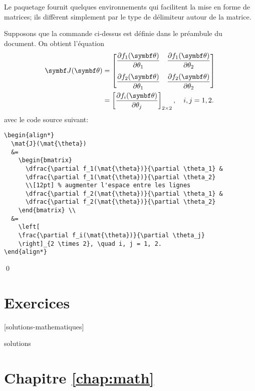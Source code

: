 \begin{exemple}
  Le paquetage  fournit quelques environnements qui
  facilitent la mise en forme de matrices; ils diffèrent simplement
  par le type de délimiteur autour de la matrice.

  Supposons que la commande \cmdprint{\mat} ci-dessus est définie dans
  le préambule du document. On obtient l'équation
  \begin{align*}
    \mat{J}(\mat{\theta})
    &=
      \begin{bmatrix}
        \dfrac{\partial f_1(\mat{\theta})}{\partial \theta_1} &
        \dfrac{\partial f_1(\mat{\theta})}{\partial \theta_2} \\[12pt]
        \dfrac{\partial f_2(\mat{\theta})}{\partial \theta_1} &
        \dfrac{\partial f_2(\mat{\theta})}{\partial \theta_2}
      \end{bmatrix} \\
    &=
      \left[
      \frac{\partial f_i(\mat{\theta})}{\partial \theta_j}
      \right]_{2 \times 2}, \quad i, j = 1, 2.
  \end{align*}
  avec le code source suivant:
\begin{lstlisting}
\begin{align*}
  \mat{J}(\mat{\theta})
  &=
    \begin{bmatrix}
      \dfrac{\partial f_1(\mat{\theta})}{\partial \theta_1} &
      \dfrac{\partial f_1(\mat{\theta})}{\partial \theta_2}
      \\[12pt] % augmenter l'espace entre les lignes
      \dfrac{\partial f_2(\mat{\theta})}{\partial \theta_1} &
      \dfrac{\partial f_2(\mat{\theta})}{\partial \theta_2}
    \end{bmatrix} \\
  &=
    \left[
    \frac{\partial f_i(\mat{\theta})}{\partial \theta_j}
    \right]_{2 \times 2}, \quad i, j = 1, 2.
\end{align*}
\end{lstlisting}
  \qed
\end{exemple}



\section{Exercices}
\label{sec:math:exercices}

[solutions-mathematiques]

\begin{Filesave}{solutions}
\section*{Chapitre \ref*{chap:math}}

\end{Filesave}




